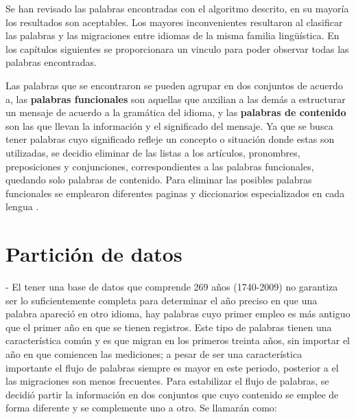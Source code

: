 Se han revisado las palabras encontradas con el algoritmo descrito, en su
mayoría los resultados son aceptables. Los mayores inconvenientes resultaron al
clasificar las palabras y las migraciones entre idiomas de la misma familia
lingüística.  En los capítulos siguientes se proporcionara un vinculo para
poder observar todas las palabras encontradas. 


Las palabras que se encontraron se pueden agrupar en dos conjuntos de acuerdo a\cite{contenidopal}, las \textbf{palabras funcionales} son aquellas que auxilian a las demás a estructurar un mensaje de acuerdo a la gramática del idioma, y las \textbf{palabras de contenido} son las que llevan la información y el significado del mensaje. Ya  que se busca tener palabras cuyo significado refleje un concepto o situación donde estas son utilizadas, se decidio eliminar de las listas a los artículos, pronombres, preposiciones y conjunciones, correspondientes a las palabras funcionales, quedando solo palabras de contenido. Para eliminar las posibles palabras funcionales se emplearon diferentes paginas y diccionarios especializados en cada lengua \cite{englishdic, frenchdic, germandic, italiandic, spanishdic}. 




\section{Partición de datos} %


-
El tener una base de datos que comprende 269 años (1740-2009) no garantiza ser lo suficientemente completa para determinar el año preciso en que una palabra apareció en otro idioma, hay palabras cuyo primer empleo es más antiguo que el primer año en que se tienen registros. Este tipo de palabras tienen una característica común y es que migran en los primeros treinta años, sin importar el año en que comiencen las mediciones; a pesar de ser una característica importante el flujo de palabras siempre es mayor en este periodo, posterior a el las migraciones son menos frecuentes. Para estabilizar 
el flujo de palabras, se decidió partir la información en dos conjuntos que cuyo contenido se emplee de forma diferente y se complemente uno a otro.  Se llamarán como:


